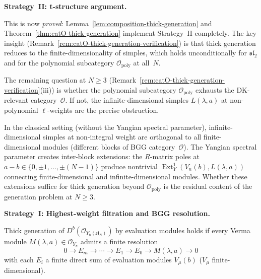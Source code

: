 \medskip

\noindent\textbf{Strategy~II\@: t-structure argument.}

This is now \emph{proved}: Lemma~\ref{lem:composition-thick-generation}
and Theorem~\ref{thm:catO-thick-generation} implement Strategy~II
completely.  The key insight
(Remark~\ref{rem:catO-thick-generation-verification}) is that
thick generation reduces to the finite-dimensionality of simples,
which holds unconditionally for $\mathfrak{sl}_2$ and for
the polynomial subcategory $\mathcal{O}_{\mathrm{poly}}$ at all~$N$.

\begin{remark}
\label{rem:infinite-dim-simples}
The remaining question at $N \ge 3$
(Remark~\ref{rem:catO-thick-generation-verification}(iii)) is
whether the polynomial subcategory $\mathcal{O}_{\mathrm{poly}}$
exhausts the DK-relevant category~$\mathcal{O}$.  If not, the
infinite-dimensional simples $L(\lambda, a)$ at non-polynomial
$\ell$-weights are the precise obstruction.

In the classical setting (without the Yangian spectral parameter),
infinite-dimensional simples at non-integral weight are orthogonal
to all finite-dimensional modules (different blocks of BGG
category~$\mathcal{O}$).  The Yangian spectral parameter creates
inter-block extensions: the $R$-matrix poles at
$a - b \in \{0, \pm 1, \ldots, \pm (N-1)\}$ produce nontrivial
$\operatorname{Ext}^1_Y(V_n(b), L(\lambda, a))$ connecting
finite-dimensional and infinite-dimensional modules.  Whether these
extensions suffice for thick generation beyond
$\mathcal{O}_{\mathrm{poly}}$ is the residual content of the
generation problem at $N \ge 3$.
\end{remark}

\medskip

\noindent\textbf{Strategy~I\@: Highest-weight filtration and BGG
resolution.}

\begin{proposition}
\label{prop:bgg-criterion}
Thick generation of
$D^b(\mathcal{O}_{Y_\hbar(\mathfrak{sl}_N)})$ by evaluation
modules holds if every Verma module
$M(\lambda, a) \in \mathcal{O}_{Y_\hbar}$ admits a finite
resolution
\begin{equation}\label{eq:verma-eval-resolution}
0 \to E_m \to \cdots \to E_1 \to E_0 \to M(\lambda, a) \to 0
\end{equation}
with each $E_i$ a finite direct sum of evaluation modules
$V_\mu(b)$ \textup{(}$V_\mu$ finite-dimensional\textup{)}.
\end{proposition}

